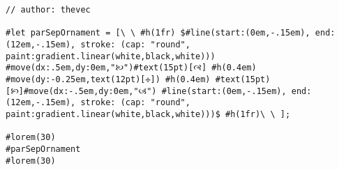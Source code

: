 \begin{verbatim}
// author: thevec

#let parSepOrnament = [\ \ #h(1fr) $#line(start:(0em,-.15em), end:(12em,-.15em), stroke: (cap: "round", paint:gradient.linear(white,black,white))) #move(dx:.5em,dy:0em,"🙠")#text(15pt)[🙣] #h(0.4em) #move(dy:-0.25em,text(12pt)[✢]) #h(0.4em) #text(15pt)[🙡]#move(dx:-.5em,dy:0em,"🙢") #line(start:(0em,-.15em), end:(12em,-.15em), stroke: (cap: "round", paint:gradient.linear(white,black,white)))$ #h(1fr)\ \ ];

#lorem(30)
#parSepOrnament
#lorem(30)
\end{verbatim}

\pandocbounded{}
